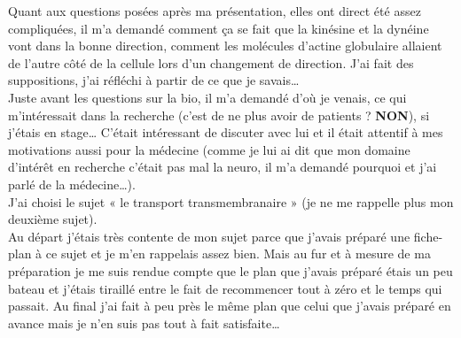 
\bigskip

Quant aux questions posées après ma présentation, elles ont direct été assez compliquées, il m’a demandé comment ça se fait que la kinésine et la dynéine vont dans la bonne direction, comment les molécules d’actine globulaire allaient de l’autre côté de la cellule lors d’un changement de direction. J’ai fait des suppositions, j’ai réfléchi à partir de ce que je savais\dots \\
Juste avant les questions sur la bio, il m’a demandé d’où je venais, ce qui m’intéressait dans la recherche (c’est de ne plus avoir de patients ? \textbf{NON}), si j’étais en stage… C’était intéressant de discuter
avec lui et il était attentif à mes motivations aussi pour la médecine (comme je lui ai dit que mon domaine d’intérêt en recherche c’était pas mal la neuro, il m’a demandé pourquoi et j’ai parlé de la
médecine…).\\

\lettrine{{\color{yellow!80!black} \oldpilcrowfive}}{}
J’ai choisi le sujet « le transport transmembranaire » (je ne me rappelle plus mon deuxième sujet).\\
Au départ j’étais très contente de mon sujet parce que j’avais préparé une fiche-plan à ce sujet et je m’en rappelais assez bien. Mais au fur et à mesure de ma préparation je me suis rendue compte que le plan que j’avais préparé étais un peu bateau et j’étais tiraillé entre le fait de recommencer tout à zéro et le temps qui passait. Au final j’ai fait à peu près le même plan que celui que j’avais
préparé en avance mais je n’en suis pas tout à fait satisfaite…\\

